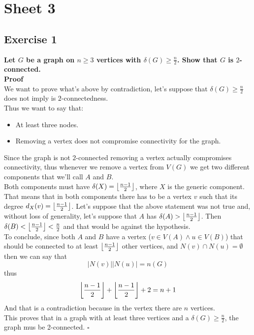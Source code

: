 \section*{Sheet 3}
\subsection*{Exercise 1}
\boldmath 
\textbf{Let $G$ be a graph on $n \geq 3$ vertices with $\delta(G) \geq \frac{n}{2}$. Show that $G$ is
$2$-connected.}
\unboldmath\\
\linebreak
\textbf{Proof}\\
We want to prove what's above by contradiction, let's suppose that $\delta(G) \geq \frac{n}{2}$ does
not imply is $2$-connectedness.\\
Thus we want to say that:
\begin{itemize}
    \item At least three nodes.
    \item Removing a vertex does not compromise connectivity for the graph.
\end{itemize}
Since the graph is not $2$-connected removing a vertex actually compromises connectivity, thus
whenever we remove a vertex from $V(G)$ we get two different components that we'll call $A$ and
$B$.\\
\linebreak
Both components must have $\delta(X) = \left\lfloor\frac{n - 1}{2}\right\rfloor$, where $X$ is the generic component.
That means that in both components there has to be a vertex $v$ such that its degree $d_X(v) =
\left\lfloor\frac{n - 1}{2}\right\rfloor$.
Let's suppose that the above statement was not true and, without loss of generality, let's suppose
that $A$ has $\delta(A) > \left\lfloor\frac{n - 1}{2}\right\rfloor$. Then $\delta(B) < \left\lfloor\frac{n - 1}{2}\right\rfloor <
\frac{n}{2}$ and that would be against the hypothesis.\\
\linebreak
To conclude, since both $A$ and $B$ have a vertex ($v \in V(A) \land u \in V(B)$) that should be connected to at least
$\left\lfloor\frac{n - 1}{2}\right\rfloor$ other vertices, and $N(v) \cap N(u) = \emptyset$ then we can say that
\begin{equation}
    |N(v)| |N(u)| = n(G)
\end{equation}
thus
\begin{equation*}
    \left\lfloor\frac{n - 1}{2}\right\rfloor + \left\lfloor\frac{n - 1}{2}\right\rfloor + 2 = n + 1
\end{equation*}
And that is a contradiction because in the vertex there are $n$ vertices.\\
This proves that in a graph with at least three vertices and a $\delta(G) \geq \frac{n}{2}$, the
graph mus be 2-connected. \hspace{10mm} $\square$
